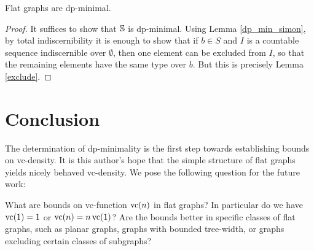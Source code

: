 \begin{Corollary}
  Flat graphs are dp-minimal.
\end{Corollary}
\begin{proof}
  It suffices to show that $\mathbb S$ is dp-minimal.
  Using Lemma \ref{dp_min_simon}, by total indiscernibility
  it is enough to show that if $b \in S$ and $I$ is a countable sequence indiscernible over $\emptyset$,
  then one element can be excluded from $I$, so that the remaining elements have the same type over $b$.
  But this is precisely Lemma \ref{exclude}.
\end{proof}

\section{Conclusion}
The determination of dp-minimality is the first step towards establishing bounds on vc-density.
It is this author's hope that the simple structure of flat graphs yields nicely behaved vc-density.
We pose the following question for the future work:
\begin{openq}
  What are bounds on vc-function $\operatorname{vc}(n)$ in flat graphs?
  In particular do we have $\operatorname{vc}(1) = 1$ or $\operatorname{vc}(n) = n \operatorname{vc}(1)$?
  Are the bounds better in specific classes of flat graphs,
  such as planar graphs, graphs with bounded tree-width, or graphs excluding certain classes of subgraphs?
\end{openq}
